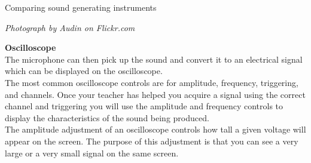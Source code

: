 \begin{activity}{Comparing sound generating instruments}
\begin{minipage}{.5\textwidth}
\begin{center}
\textsl{Photograph by Audin on Flickr.com}\\
\end{center}
\end{minipage}



\begin{minipage}{.5\textwidth}

\textbf{Oscilloscope} \\
The microphone can then pick up the sound and convert it to an electrical signal which can be displayed on the oscilloscope.\\
 
The most common oscilloscope controls are for amplitude, frequency, triggering, and channels. Once your teacher has helped you acquire a signal using the correct channel and triggering you will use the amplitude and frequency controls to display the characteristics of the sound being produced.\\
 
The amplitude adjustment of an oscilloscope controls how tall a given voltage will appear on the screen. The purpose of this adjustment is that you can see a very large or a very small signal on the same screen. \\


\end{minipage}
\end{activity}
